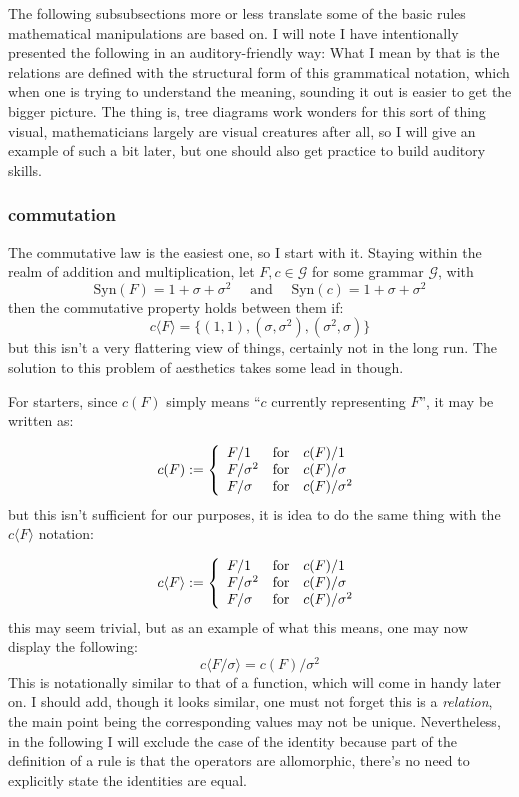 \documentclass[twoside]{article}
\begin{document}
The following subsubsections more or less translate some of the basic rules mathematical manipulations are based on.
I will note I have intentionally presented the following in an auditory-friendly way:  What I mean by that is the
relations are defined with the structural form of this grammatical notation, which when one is trying to understand
the meaning, sounding it out is easier to get the bigger picture.  The thing is, tree diagrams work wonders for this
sort of thing visual, mathematicians largely are visual creatures after all, so I will give an example of such a bit
later, but one should also get practice to build auditory skills.

\subsubsection{commutation}

The commutative law is the easiest one, so I start with it.  Staying within the realm of addition and multiplication,
let $ F, c\in\mathcal{G} $ for some grammar $ \mathcal{G} $, with
$$ \mbox{Syn}(F)=1+\sigma+\sigma^2\quad\mbox{ and }\quad \mbox{Syn}(c)=1+\sigma+\sigma^2 $$
then the commutative property holds between them if:
$$ c\langle F\rangle=\{(1, 1), (\sigma, \sigma^2), (\sigma^2, \sigma)\} $$
but this isn't a very flattering view of things, certainly not in the long run.  The solution to this problem of
aesthetics takes some lead in though.

For starters, since $ c(F) $ simply means ``$ c $ currently representing $ F $'', it may be written as:

$$ c(F):=\left\{
\begin{array}{l@{\quad\mbox{for}\quad}l}
 F/1 & c(F)/1 \\
 F/\sigma^2 & c(F)/\sigma \\
 F/\sigma & c(F)/\sigma^2
\end{array}\right. $$
but this isn't sufficient for our purposes, it is idea to do the same thing with the $ c\langle F\rangle $ notation:

$$ c\langle F\rangle :=\left\{
\begin{array}{l@{\quad\mbox{for}\quad}l}
 F/1 & c(F)/1 \\
 F/\sigma^2 & c(F)/\sigma \\
 F/\sigma & c(F)/\sigma^2
\end{array}\right. $$
this may seem trivial, but as an example of what this means, one may now display the following:
$$ c\langle F/\sigma\rangle =c(F)/\sigma^2 $$
This is notationally similar to that of a function, which will come in handy later on.  I should add, though it looks
similar, one must not forget this is a \emph{relation}, the main point being the corresponding values may not be unique.
Nevertheless, in the following I will exclude the case of the identity because part of the definition of a rule is that
the operators are allomorphic, there's no need to explicitly state the identities are equal.
\end{document}
